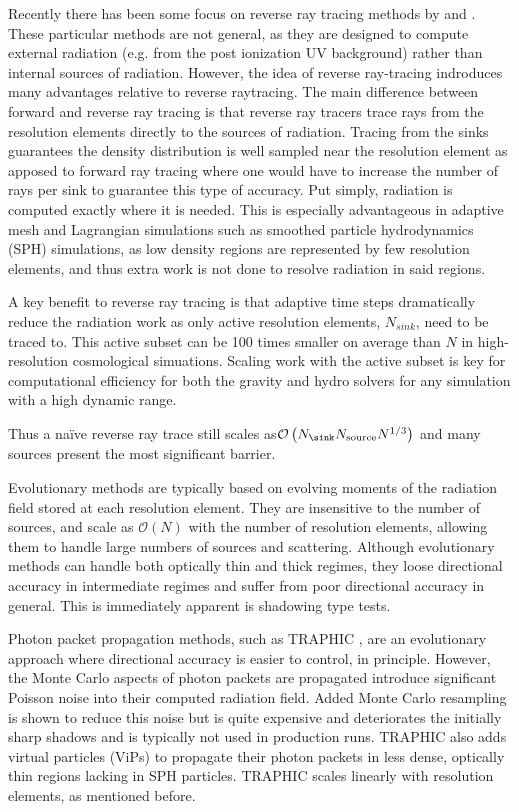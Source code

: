 \documentclass[fleq,usenatbib]{mnras}
\newcommand{\bigO}[1]{\mathcal{O}\left(#1\right)}
\newcommand{\NS}{N_{\rm source}}
\begin{document}
Recently there has been some focus on reverse ray tracing methods by
\cite{clarkEt12} and \cite{altayTheuns13}. These particular methods are not general, 
as they are designed to compute external radiation (e.g. from the post ionization UV 
background) rather than internal sources of radiation. However, the idea of 
reverse ray-tracing indroduces many advantages relative to reverse raytracing.
The main difference between forward and 
reverse ray tracing is that reverse ray tracers trace rays from the resolution 
elements directly to the sources of radiation. Tracing from the sinks 
guarantees the density distribution is well sampled near the resolution 
element as apposed to forward ray tracing where one would have to increase the 
number of rays per sink to guarantee this type of accuracy. Put simply, 
radiation is computed exactly where it is needed.  This is especially 
advantageous in adaptive mesh and Lagrangian simulations such as smoothed 
particle hydrodynamics (SPH) simulations, as low density regions are 
represented by few resolution elements, and thus extra work is not done to 
resolve radiation in said regions.

A key benefit to reverse ray tracing is that adaptive 
time steps dramatically reduce the radiation work as only active resolution elements, $N_{sink}$, need to be traced to.  This active subset can be 100 times smaller on average than $N$ in high-resolution cosmological simuations.  Scaling work with the active subset is key for computational efficiency for both the gravity and hydro solvers for any simulation with a high dynamic range.

Thus a na\"ive reverse ray trace 
still scales as$\bigO{N_{\sink} \NS N^{1/3}}$ and 
many sources present the most significant barrier.

Evolutionary methods are typically based on evolving moments of the radiation 
field stored at each resolution element. They are insensitive to the number 
of sources, and scale as $\mathcal{O}(N)$ with the number of resolution 
elements, allowing them to handle large numbers of sources and scattering. 
Although evolutionary methods can handle both optically thin and thick 
regimes, they loose directional accuracy in intermediate regimes and suffer 
from poor directional accuracy in general.  This is immediately apparent is shadowing type tests.

Photon packet propagation methods, such as TRAPHIC \citep{pawlikSchaye08}, are 
an evolutionary approach where directional accuracy is easier to control, in principle.
However, the Monte Carlo aspects of 
photon packets are propagated introduce significant Poisson noise 
into their computed radiation field.
Added Monte Carlo resampling is shown to reduce 
this noise but is quite expensive and deteriorates the initially sharp 
shadows and is typically not used in production runs.
TRAPHIC also adds virtual particles (ViPs) to propagate their photon packets 
in less dense, optically thin regions lacking in SPH particles. 
TRAPHIC scales linearly with resolution elements, as mentioned before.
\end{document}
